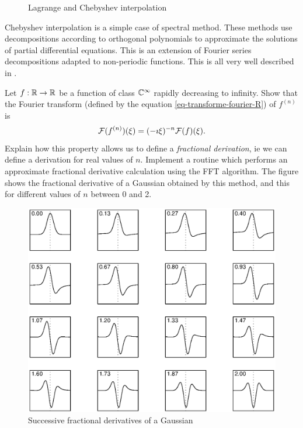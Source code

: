 \begin{exo}
\begin{figure}[ht]
\begin{center}
    \end{center}
    \caption{Lagrange and Chebyshev interpolation}
              \label{fig-interpolation-chebyshev}
\end{figure}
 Chebyshev interpolation is a simple case of spectral method. These methods use decompositions according to orthogonal polynomials to approximate the solutions of partial differential equations. This is an extension of Fourier series decompositions adapted to non-periodic functions. This is all very well described in .
\end{exo}
 
 
\begin{exo}
\label{exo-derivation-fractionionnaire}
 
 Let $ f: \mathbb{R} \rightarrow \mathbb{R} $ be a function of class $ \mathbb{C}^\infty $ rapidly decreasing to infinity. Show that the Fourier transform (defined by the equation \eqref{eq-transforme-fourier-R}) of $ f^{(n)} $ is
\begin{equation*}
\mathcal{F}(f^{(n)}) (\xi) = (- \imath \xi)^{- n} \mathcal{F}(f) (\xi).
\end{equation*}
Explain how this property allows us to define a \textit{fractional derivation}, ie we can define a derivation for real values of $ n $. Implement a \Matlab{} routine which performs an approximate fractional derivative calculation using the FFT algorithm. The figure  shows the fractional derivative of a Gaussian obtained by this method, and this for different values of $ n $ between 0 and 2. \begin{figure}[ht]
    \begin{center}
    \includegraphics [scale = 0.5]{images/derivation-fractionnaire.eps}
    \end{center}
    \caption{Successive fractional derivatives of a Gaussian}
              \label{fig-derivation-fractionionnaire}
\end{figure}
\end{exo}
 
